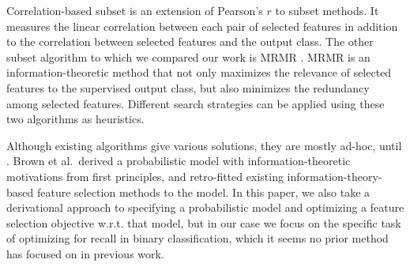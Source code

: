 Correlation-based subset \cite{Hall1998} is an extension
of Pearson's $r$ to subset methods. It measures the linear correlation
between each pair of selected features in addition to the correlation
between selected features and the output class. The other subset
algorithm to which we compared our work is MRMR \cite{peng2005}.
MRMR is an information-theoretic method that not only maximizes
the relevance of selected features to the supervised output class,
but also minimizes the redundancy among selected features. Different
search strategies can be applied using these two algorithms as
heuristics.

Although existing algorithms give various solutions, they are mostly
ad-hoc, until \cite{brown2012conditional}. Brown et al.\ derived a 
probabilistic model with information-theoretic motivations from first principles, and retro-fitted
existing information-theory-based feature selection methods to the
model. In this paper, we also take a derivational approach to
specifying a probabilistic model and optimizing a feature selection
objective w.r.t. that model, but in our case we focus on the specific
task of optimizing for recall in binary classification, which it 
seems no prior method has focused on in previous work.


